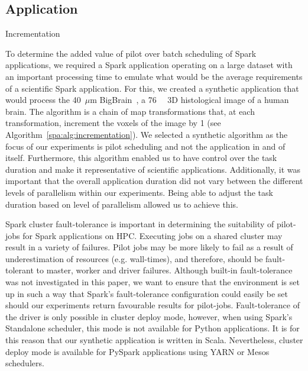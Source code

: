 	\subsection{Application}
	    \begin{algorithm}\caption{Incrementation}\label{spa:alg:incrementation}
	    
		  
		    
	    \end{algorithm}
	To determine the added value of pilot over batch scheduling of Spark
	applications, we required a Spark application operating on a large
	dataset with an important processing time to emulate what would be the
	average requirements of a scientific Spark application. For this, we
	created a synthetic application that would process the 40~$\mu$m
	BigBrain~\cite{amunts2013bigbrain}, a \SI{76}{\giga\byte} 3D
	histological image of a human brain. The algorithm is a chain of map
	transformations that, at each transformation, increment the voxels of
	the image by 1 (see Algorithm~\ref{spa:alg:incrementation}). We selected
	a synthetic algorithm as the focus of our experiments is pilot
	scheduling and not the application in and of itself. Furthermore, this
	algorithm enabled us to have control over the task duration and make it
	representative of scientific applications. Additionally, it was
	important that the overall application duration did not vary between the
	different levels of parallelism within our experiments. Being able to
	adjust the task duration based on level of parallelism allowed us to
	achieve this.
    
	Spark cluster fault-tolerance is important in determining the
	suitability of pilot-jobs for Spark applications on HPC. Executing jobs
	on a shared cluster may result in a variety of failures. Pilot jobs may
	be more likely to fail as a result of underestimation of resources (e.g.
	wall-times), and therefore, should be fault-tolerant to master, worker
	and driver failures. Although built-in fault-tolerance was not
	investigated in this paper, we want to ensure that the environment is
	set up in such a way that Spark's fault-tolerance configuration could
	easily be set should our experiments return favourable results for
	pilot-jobs. Fault-tolerance of the driver is only possible in cluster
	deploy mode, however, when using Spark's Standalone scheduler, this mode
	is not available for Python applications. It is for this reason that our
	synthetic application is written in Scala. Nevertheless, cluster deploy
	mode is available for PySpark applications using YARN or Mesos
	schedulers.
    
